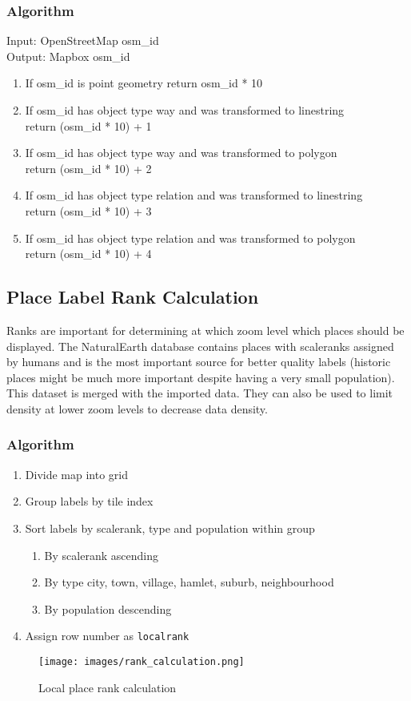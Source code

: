 \subsubsection*{Algorithm}
Input: OpenStreetMap osm\_id\\
Output: Mapbox osm\_id
\begin{enumerate}
    \item If osm\_id is point geometry return osm\_id * 10
    \item If osm\_id has object type way and was transformed to linestring\\
    return (osm\_id * 10) + 1
    \item If osm\_id has object type way and was transformed to polygon\\
    return (osm\_id * 10) + 2
    \item If  osm\_id has object type relation and was transformed to linestring\\
    return (osm\_id * 10) + 3
    \item If osm\_id has object type relation and was transformed to polygon\\
    return (osm\_id * 10) + 4
\end{enumerate}

\clearpage
\subsection{Place Label Rank Calculation}

Ranks are important for determining at which zoom level which places should be displayed. The NaturalEarth database contains places with scaleranks assigned by humans and is the most important source for better quality labels (historic places might be much more important despite having a very small population). This dataset is merged with the imported \osm{} data.
They can also be used to limit density at lower zoom levels to decrease data density.

\subsubsection*{Algorithm}

\begin{enumerate}  
    \item Divide map into grid
    \item Group labels by tile index
    \item Sort labels by scalerank, type and population within group
    \begin{enumerate}
        \item By scalerank ascending
        \item By type city, town, village, hamlet, suburb, neighbourhood
        \item By population descending
    \end{enumerate}
    \item Assign row number as \texttt{localrank}
\end{enumerate}


\begin{figure}[H]
\centering
\texttt{[image: images/rank\_calculation.png]}
\caption{Local place rank calculation}
\end{figure}

